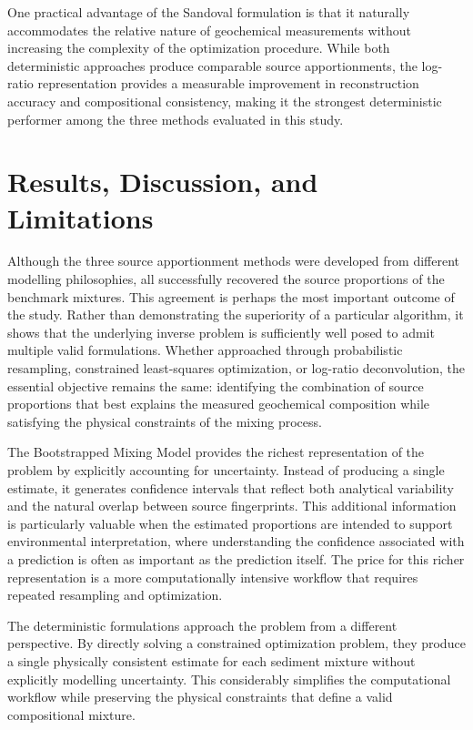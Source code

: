 \documentclass[
  12pt,
  letterpaper,
]{book}
\begin{document}
One practical advantage of the Sandoval formulation is that it naturally
accommodates the relative nature of geochemical measurements without
increasing the complexity of the optimization procedure. While both
deterministic approaches produce comparable source apportionments, the
log-ratio representation provides a measurable improvement in
reconstruction accuracy and compositional consistency, making it the
strongest deterministic performer among the three methods evaluated in
this study.

\section{Results, Discussion, and
Limitations}\label{results-discussion-and-limitations-10}

Although the three source apportionment methods were developed from
different modelling philosophies, all successfully recovered the source
proportions of the benchmark mixtures. This agreement is perhaps the
most important outcome of the study. Rather than demonstrating the
superiority of a particular algorithm, it shows that the underlying
inverse problem is sufficiently well posed to admit multiple valid
formulations. Whether approached through probabilistic resampling,
constrained least-squares optimization, or log-ratio deconvolution, the
essential objective remains the same: identifying the combination of
source proportions that best explains the measured geochemical
composition while satisfying the physical constraints of the mixing
process.

The Bootstrapped Mixing Model provides the richest representation of the
problem by explicitly accounting for uncertainty. Instead of producing a
single estimate, it generates confidence intervals that reflect both
analytical variability and the natural overlap between source
fingerprints. This additional information is particularly valuable when
the estimated proportions are intended to support environmental
interpretation, where understanding the confidence associated with a
prediction is often as important as the prediction itself. The price for
this richer representation is a more computationally intensive workflow
that requires repeated resampling and optimization.

The deterministic formulations approach the problem from a different
perspective. By directly solving a constrained optimization problem,
they produce a single physically consistent estimate for each sediment
mixture without explicitly modelling uncertainty. This considerably
simplifies the computational workflow while preserving the physical
constraints that define a valid compositional mixture.
\end{document}
